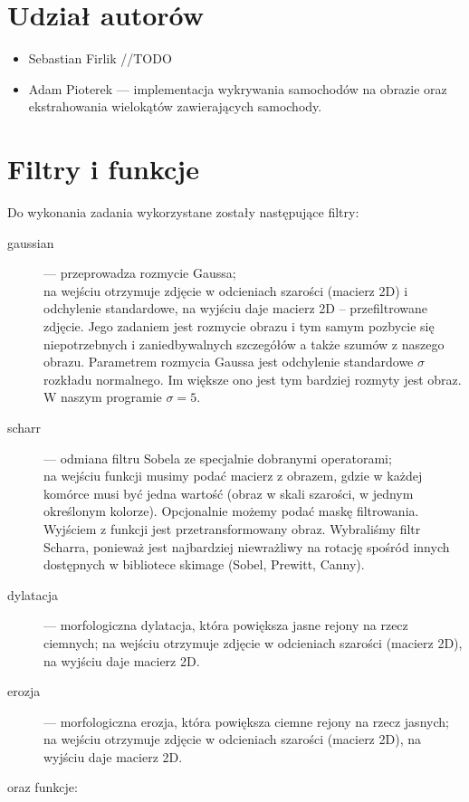 \documentclass{article}
\begin{document}


\section*{Udział autorów}
\begin{itemize}
\item Sebastian Firlik //TODO
\item Adam Pioterek — implementacja wykrywania samochodów na obrazie oraz ekstrahowania wielokątów zawierających samochody.
\end{itemize}

\section{Filtry i funkcje}
Do wykonania zadania wykorzystane zostały następujące filtry:
\begin{description}
\item[gaussian] — przeprowadza rozmycie Gaussa;\\
na wejściu otrzymuje zdjęcie w odcieniach szarości (macierz 2D) i odchylenie standardowe, na wyjściu daje macierz 2D – przefiltrowane zdjęcie.
Jego zadaniem jest rozmycie obrazu i tym samym pozbycie się niepotrzebnych i zaniedbywalnych szczegółów  a także szumów z naszego obrazu. Parametrem rozmycia Gaussa jest odchylenie standardowe $\sigma$ rozkładu normalnego. Im większe ono jest tym bardziej rozmyty jest obraz. W naszym programie $\sigma = 5$. 
\item[scharr] — odmiana filtru Sobela ze specjalnie dobranymi operatorami;\\
na wejściu funkcji musimy podać macierz z obrazem, gdzie w każdej komórce musi być jedna wartość (obraz w skali szarości, w jednym określonym kolorze). Opcjonalnie możemy podać maskę filtrowania. Wyjściem z funkcji jest przetransformowany obraz. Wybraliśmy filtr Scharra, ponieważ jest najbardziej niewrażliwy na rotację spośród innych dostępnych w bibliotece skimage (Sobel, Prewitt, Canny).
\item[dylatacja] — morfologiczna dylatacja, która powiększa jasne rejony na rzecz ciemnych;
na wejściu otrzymuje zdjęcie w odcieniach szarości (macierz 2D), na wyjściu daje macierz 2D.
\item[erozja] — morfologiczna erozja, która powiększa ciemne rejony na rzecz jasnych;
na wejściu otrzymuje zdjęcie w odcieniach szarości (macierz 2D), na wyjściu daje macierz 2D.
\end{description}
oraz funkcje:
\end{document}
